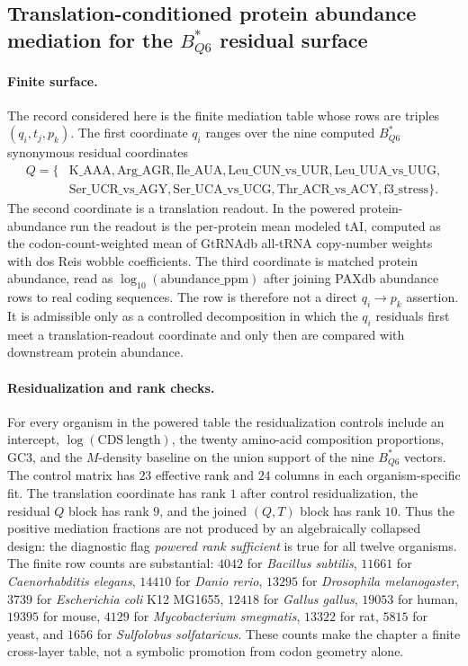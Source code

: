 \subsection{Translation-conditioned protein abundance mediation for the $B^{\ast}_{Q6}$ residual surface}
\label{subsec:q6-translation-mediated-protein-abundance-cross-layer}

\paragraph{Finite surface.}
The record considered here is the finite mediation table whose rows are triples $(q_i,t_j,p_k)$.  The first coordinate $q_i$ ranges over the nine computed $B^{\ast}_{Q6}$ synonymous residual coordinates
$$
\begin{aligned}
Q=\{&\mathrm{K\_AAA},\mathrm{Arg\_AGR},\mathrm{Ile\_AUA},\mathrm{Leu\_CUN\_vs\_UUR},\mathrm{Leu\_UUA\_vs\_UUG},\\
&\mathrm{Ser\_UCR\_vs\_AGY},\mathrm{Ser\_UCA\_vs\_UCG},\mathrm{Thr\_ACR\_vs\_ACY},\mathrm{f3\_stress}\}.
\end{aligned}
$$
The second coordinate is a translation readout.  In the powered protein-abundance run the readout is the per-protein mean modeled tAI, computed as the codon-count-weighted mean of GtRNAdb all-tRNA copy-number weights with dos Reis wobble coefficients.  The third coordinate is matched protein abundance, read as $\log_{10}(\mathrm{abundance\_ppm})$ after joining PAXdb abundance rows to real coding sequences.  The row is therefore not a direct $q_i \to p_k$ assertion.  It is admissible only as a controlled decomposition in which the $q_i$ residuals first meet a translation-readout coordinate and only then are compared with downstream protein abundance.

\paragraph{Residualization and rank checks.}
For every organism in the powered table the residualization controls include an intercept, $\log(\mathrm{CDS\ length})$, the twenty amino-acid composition proportions, GC3, and the $M$-density baseline on the union support of the nine $B^{\ast}_{Q6}$ vectors.  The control matrix has $23$ effective rank and $24$ columns in each organism-specific fit.  The translation coordinate has rank $1$ after control residualization, the residual $Q$ block has rank $9$, and the joined $(Q,T)$ block has rank $10$.  Thus the positive mediation fractions are not produced by an algebraically collapsed design: the diagnostic flag \emph{powered rank sufficient} is true for all twelve organisms.  The finite row counts are substantial: $4042$ for \emph{Bacillus subtilis}, $11661$ for \emph{Caenorhabditis elegans}, $14410$ for \emph{Danio rerio}, $13295$ for \emph{Drosophila melanogaster}, $3739$ for \emph{Escherichia coli} K12 MG1655, $12418$ for \emph{Gallus gallus}, $19053$ for human, $19395$ for mouse, $4129$ for \emph{Mycobacterium smegmatis}, $13322$ for rat, $5815$ for yeast, and $1656$ for \emph{Sulfolobus solfataricus}.  These counts make the chapter a finite cross-layer table, not a symbolic promotion from codon geometry alone.

